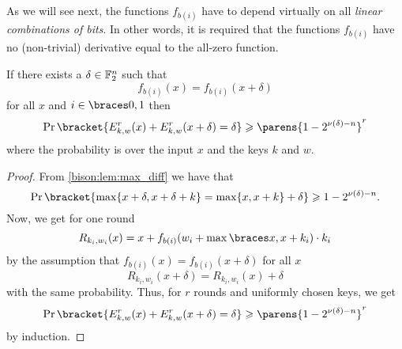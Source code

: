 As we will see next, the functions $f_{b(i)}$ have to depend virtually on all \emph{linear combinations of bits}.
In other words, it is required that the functions $f_{b(i)}$ have no (non-trivial) derivative equal to the all-zero function.

\begin{lemma}
    If there exists a $\delta\in\mathbb{F}_2^n$ such that
    \begin{equation*}
        f_{b(i)}(x) = f_{b(i)}(x+\delta)
    \end{equation*}
    for all $x$ and $i\in \set{0,1}$ then
    \begin{equation*}
        \Pr\bracket{E_{k,w}^r(x)+E_{k,w}^r(x+\delta)=\delta} \geqslant \parens{1-2^{\nu(\delta)-n}}^{r}
    \end{equation*}
    where the probability is over the input $x$ and the keys $k$ and $w$.
\end{lemma}
\begin{proof}
    From \cref{bison:lem:max_diff} we have that
    \begin{equation*}
        \Pr\bracket{\max\{x+\delta,x+\delta+k\}=\max\{x,x+k\}+\delta} \geqslant 1-2^{\nu(\delta)-n}.
    \end{equation*}
    Now, we get for one round
    \begin{equation*}
        R_{k_i,w_i}(x) = x + f_{b(i)}(w_i + \max\set{x, x + k_i}) \cdot k_i
    \end{equation*}
    by the assumption that $f_{b(i)}(x)=f_{b(i)}(x+\delta)$ for all $x$
    \begin{equation*}
        R_{k_i,w_i}(x+\delta)= R_{k_i,w_i}(x)+\delta
    \end{equation*}
    with the same probability.
    Thus, for $r$ rounds and uniformly chosen keys, we get
    \begin{equation*}
        \Pr\bracket{E_{k,w}^r(x)+E_{k,w}^r(x+\delta)=\delta} \geqslant \parens{1-2^{\nu(\delta)-n}}^{r}
    \end{equation*}
    by induction.
\end{proof}

